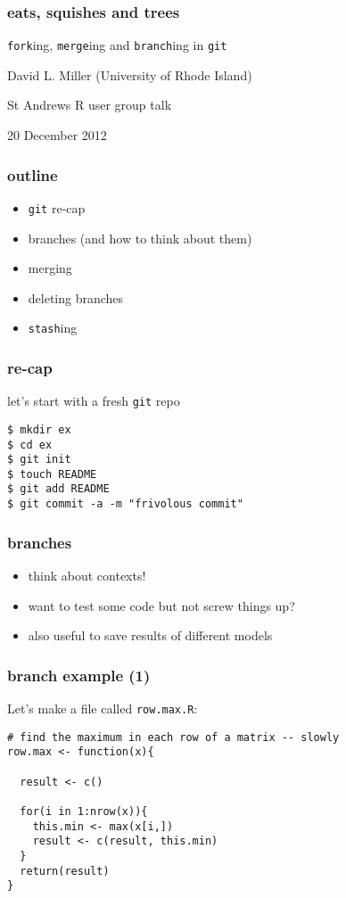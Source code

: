 \documentclass[ignorenonframetext,]{beamer}
\begin{document}
\begin{frame}[fragile]\frametitle{eats, squishes and trees}

\texttt{fork}ing, \texttt{merge}ing and \texttt{branch}ing in
\texttt{git}

David L. Miller (University of Rhode Island)

St Andrews R user group talk

20 December 2012

\end{frame}

\begin{frame}[fragile]\frametitle{outline}

\begin{itemize}[<+->]
\item
  \texttt{git} re-cap
\item
  branches (and how to think about them)
\item
  merging
\item
  deleting branches
\item
  \texttt{stash}ing
\end{itemize}

\end{frame}

\begin{frame}[fragile]\frametitle{re-cap}

let's start with a fresh \texttt{git} repo

\begin{verbatim}
$ mkdir ex
$ cd ex
$ git init
$ touch README
$ git add README
$ git commit -a -m "frivolous commit"
\end{verbatim}

\end{frame}

\begin{frame}\frametitle{branches}

\begin{itemize}[<+->]
\item
  think about contexts!
\item
  want to test some code but not screw things up?
\item
  also useful to save results of different models
\end{itemize}

\end{frame}

\begin{frame}[fragile]\frametitle{branch example (1)}

Let's make a file called \texttt{row.max.R}:

\begin{verbatim}
# find the maximum in each row of a matrix -- slowly
row.max <- function(x){

  result <- c()

  for(i in 1:nrow(x)){
    this.min <- max(x[i,])
    result <- c(result, this.min)
  }
  return(result)
}
\end{verbatim}

\end{frame}
\end{document}
